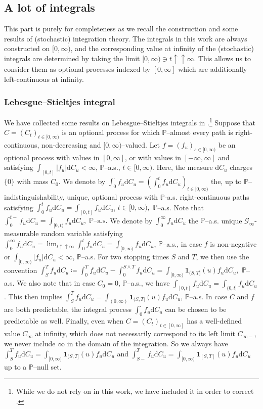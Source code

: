 \documentclass[10pt]{article} %
\newcommand\cG{\mathcal G}
\def \P{\mathbb{P}}
\newcommand{\1}{\mathbf{1}}
\def\d{\mathrm{d}}
\begin{document}
\subsection{A lot of integrals}\label{sec::integrals}

This part is purely for completeness as we recall the construction and some results of (stochastic) integration theory. The integrals in this work are always constructed on $[0,\infty)$, and the corresponding value at infinity of the (stochastic) integrals are determined by taking the limit $[0,\infty) \ni t \uparrow\uparrow \infty$. This allows us to consider them as optional processes indexed by $[0,\infty]$ which are additionally left-continuous at infinity.

\subsubsection{Lebesgue--Stieltjes integral}\label{subsec::integrals}
We have collected some results on Lebesgue--Stieltjes integrals in .\footnote{While we do not rely on  in this work, we have included it in order to correct \cite[Lemma B.1]{papapantoleon2018existence}.} Suppose that $C = (C_t)_{t \in [0,\infty)}$ is an optional process for which $\P$--almost every path is right-continuous, non-decreasing and $[0,\infty)$--valued. Let $f = (f_u)_{s \in [0,\infty)}$ be an optional process with values in $[0,\infty]$, or with values in $[-\infty,\infty]$ and satisfying $\int_{[0,t]} |f_u| \d C_u < \infty$, $\P$--a.s., $t \in [0,\infty)$. Here, the measure $\d C_u$ charges $\{0\}$ with mass $C_0$. We denote by $\int_0^\cdot f_u \d C_u = (\int_0^t f_u \d C_u)_{t \in [0,\infty)}$ the, up to $\P$--indistinguishability, unique, optional process with $\P$-a.s. right-continuous paths satisfying  $\int_0^t f_u \d C_u = \int_{[0,t]} f_u \d C_u$, $t \in [0,\infty),$ $\P$--a.s. Note that $\int_0^{t-} f_u \d C_u = \int_{[0,t)} f_u \d C_u, \; \text{$\P$--a.s.}$ We denote by $\int_0^\infty f_u \d C_u$ the $\P$--a.s. unique $\cG_\infty$-measurable random variable satisfying $\int_0^\infty f_u \d C_u = \lim_{t \uparrow\uparrow \infty} \int_0^t f_u \d C_u = \int_{[0,\infty)} f_u \d C_u$, $\P$--a.s., in case $f$ is non-negative or $\int_{[0,\infty)} |f_u| \d C_u < \infty$, $\P$--a.s.
For two stopping times $S$ and $T$, we then use the convention $\int_S^T f_u \d C_u \coloneqq \int_0^T f_u \d C_u - \int_0^{S \land T} f_u \d C_u = \int_{[0,\infty)} \mathbf{1}_{(S,T]}(u) f_u \d C_u,$ $\P$--a.s. We also note that in case $C_0 = 0$, $\P$--a.s., we have $\int_{[0,t]} f_u \d C_u = \int_{(0,t]} f_u \d C_u$. This then implies $\int_S^T f_u \d C_u = \int_{(0,\infty)} \mathbf{1}_{(S,T]}(u) f_u \d C_u$, $\P$--a.s. In case $C$ and $f$ are both predictable, the integral process $\int_0^\cdot f_u \d C_u$ can be chosen to be predictable as well. Finally, even when $C = (C_t)_{t \in [0,\infty]}$ has a well-defined value $C_\infty$ at infinity, which does not necessarily correspond to its left limit $C_{\infty-}$, we never include $\infty$ in the domain of the integration. So we always have $\int_S^T f_u \d C_u = \int_{[0,\infty)}\1_{(S,T]}(u) f_u \d C_u$ and $\int_{S-}^T f_u \d C_u = \int_{[0,\infty)}\1_{[S,T]}(u) f_u \d C_u$ up to a $\P$--null set.
\end{document}
